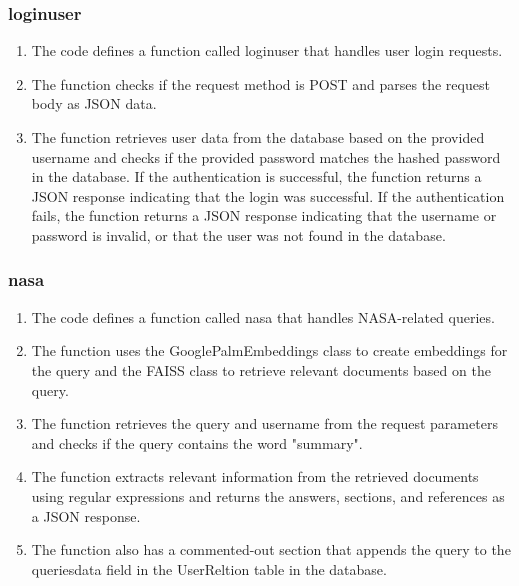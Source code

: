 \documentclass[11pt]{article}
\begin{document}
\subsubsection{loginuser}
\begin{enumerate}
	\item The code defines a function called loginuser that handles user login requests.
	\item The function checks if the request method is POST and parses the request body as JSON data.
	\item The function retrieves user data from the database based on the provided username and checks if the provided password matches the hashed password in the database.
	      If the authentication is successful, the function returns a JSON response indicating that the login was successful.
	      If the authentication fails, the function returns a JSON response indicating that the username or password is invalid, or that the user was not found in the database.
\end{enumerate}
\subsubsection{nasa}
\begin{enumerate}
	\item The code defines a function called nasa that handles NASA-related queries.
	\item The function uses the GooglePalmEmbeddings class to create embeddings for the query and the FAISS class to retrieve relevant documents based on the query.
	\item The function retrieves the query and username from the request parameters and checks if the query contains the word "summary".
	\item The function extracts relevant information from the retrieved documents using regular expressions and returns the answers, sections, and references as a JSON response.
	\item The function also has a commented-out section that appends the query to the queriesdata field in the UserReltion table in the database.
\end{enumerate}
\end{document}
